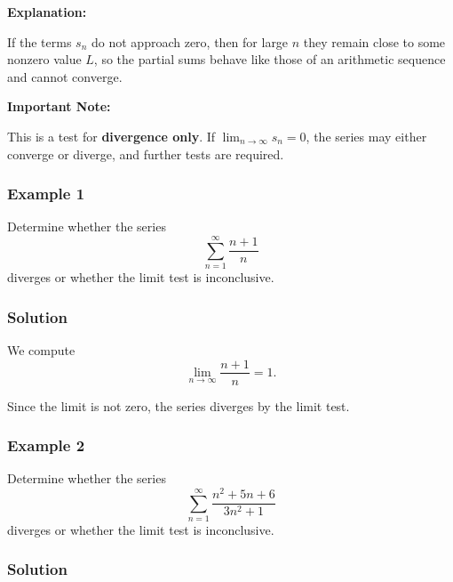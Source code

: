 \textbf{Explanation:}

If the terms $s_n$ do not approach zero, then for large $n$ they remain 
close to some nonzero value $L$, so the partial sums behave like those 
of an arithmetic sequence and cannot converge.

\textbf{Important Note:}

This is a test for \textbf{divergence only}. If $\lim_{n \to \infty} s_n = 0$, 
the series may either converge or diverge, and further tests are required.

\subsubsection{Example 1}
\label{sss:exam-acc3}

Determine whether the series
\[
\sum_{n=1}^{\infty} \frac{n+1}{n}
\]
diverges or whether the limit test is inconclusive.

\subsubsection{Solution}
\label{sss:solu-acc3}

We compute
\[
\lim_{n \to \infty} \frac{n+1}{n} = 1.
\]

Since the limit is not zero, the series diverges by the limit test.

\subsubsection{Example 2}
\label{sss:exam-5bdd}

Determine whether the series
\[
\sum_{n=1}^{\infty} \frac{n^2 + 5n + 6}{3n^2 + 1}
\]
diverges or whether the limit test is inconclusive.

\subsubsection{Solution}
\label{sss:solu-5bdd}

